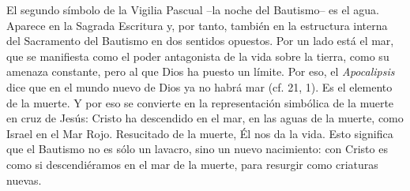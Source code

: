 \begin{body}
El segundo símbolo de la Vigilia Pascual –la noche del Bautismo– es el agua. Aparece en la Sagrada Escritura y, por tanto, también en la estructura interna del Sacramento del Bautismo en dos sentidos opuestos. Por un lado está el mar, que se manifiesta como el poder antagonista de la vida sobre la tierra, como su amenaza constante, pero al que Dios ha puesto un límite. Por eso, el \textit{Apocalipsis} dice que en el mundo nuevo de Dios ya no habrá mar (cf. 21, 1). Es el elemento de la muerte. Y por eso se convierte en la representación simbólica de la muerte en cruz de Jesús: Cristo ha descendido en el mar, en las aguas de la muerte, como Israel en el Mar Rojo. Resucitado de la muerte, Él nos da la vida. Esto significa que el Bautismo no es sólo un lavacro, sino un nuevo nacimiento: con Cristo es como si descendiéramos en el mar de la muerte, para resurgir como criaturas nuevas.


\end{body}
